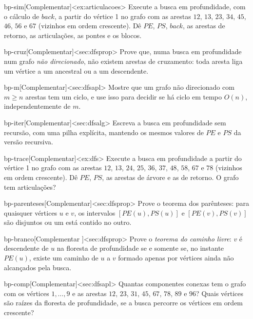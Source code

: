 \excompl
\begin{exercicio}{bp-sim}[Complementar]<ex:articulacoes>
Execute a busca em profundidade, com o cálculo de $back$, a partir do vértice 1 no grafo com as arestas $12$, $13$, $23$, $34$, $45$, $46$, $56$ e $67$ (vizinhos em ordem crescente). Dê $PE$, $PS$, $back$, as arestas de retorno, as articulações, as pontes e os blocos.
\end{exercicio}
\begin{exercicio}{bp-cruz}[Complementar]<sec:dfsprop>
Prove que, numa busca em profundidade num grafo \emph{não direcionado}, não existem arestas de cruzamento: toda aresta liga um vértice a um ancestral ou a um descendente.
\end{exercicio}
\begin{exercicio}{bp-m}[Complementar]<sec:dfsapl>
Mostre que um grafo não direcionado com $m\ge n$ arestas tem um ciclo, e use isso para decidir se há ciclo em tempo $O(n)$, independentemente de $m$.
\end{exercicio}
\begin{exercicio}{bp-iter}[Complementar]<sec:dfsalg>
Escreva a busca em profundidade sem recursão, com uma pilha explícita, mantendo os mesmos valores de $PE$ e $PS$ da versão recursiva.
\end{exercicio}
\begin{exercicio}{bp-trace}[Complementar]<ex:dfs>
Execute a busca em profundidade a partir do vértice 1 no grafo com as arestas $12$, $13$, $24$, $25$, $36$, $37$, $48$, $58$, $67$ e $78$ (vizinhos em ordem crescente). Dê $PE$, $PS$, as arestas de árvore e as de retorno. O grafo tem articulações?
\end{exercicio}
\begin{exercicio}{bp-parenteses}[Complementar]<sec:dfsprop>
Prove o teorema dos parênteses: para quaisquer vértices $u$ e $v$, os intervalos $[PE(u),PS(u)]$ e $[PE(v),PS(v)]$ são disjuntos ou um está contido no outro.
\end{exercicio}
\begin{exercicio}{bp-branco}[Complementar \estrela]<sec:dfsprop>
Prove o \emph{teorema do caminho livre}: $v$ é descendente de $u$ na floresta de profundidade se e somente se, no instante $PE(u)$, existe um caminho de $u$ a $v$ formado apenas por vértices ainda não alcançados pela busca.
\end{exercicio}
\begin{exercicio}{bp-comp}[Complementar]<sec:dfsapl>
Quantas componentes conexas tem o grafo com os vértices $1,\dots,9$ e as arestas $12$, $23$, $31$, $45$, $67$, $78$, $89$ e $96$? Quais vértices são raízes da floresta de profundidade, se a busca percorre os vértices em ordem crescente?
\end{exercicio}
